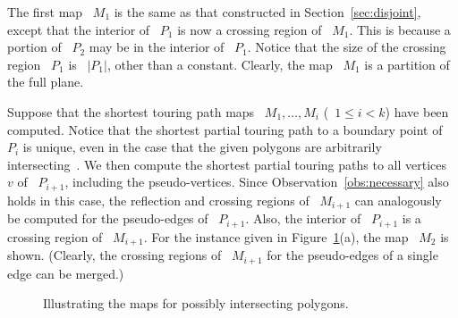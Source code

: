 \documentclass[11pt]{article}
\begin{document}
The first map ~\(M_1\) is the same as that constructed in Section~\ref{sec:disjoint}, except that the interior of ~\(P_1\) is now a crossing region of ~\(M_1\).
This is because a portion of ~\(P_2\) may be in the interior of ~\(P_1\).
Notice that the size of the crossing region ~\(P_1\) is ~\(|P_1|\), other than a constant.
Clearly, the map ~\(M_1\) is a partition of the full plane.

Suppose that the shortest touring path maps ~\(M_1, \ldots, M_i\) (~\(1 \le i < k\)) have been computed.
Notice that the shortest partial touring path to a boundary point of ~\(P_i\) is unique, even in the case that the given polygons are arbitrarily intersecting~\cite{ref6}.
We then compute the shortest partial touring paths to all vertices ~\(v\) of ~\(P_{i+1}\), including the pseudo-vertices.
Since Observation~\ref{obs:necessary} also holds in this case, the reflection and crossing regions of ~\(M_{i+1}\) can analogously be computed for the pseudo-edges of ~\(P_{i+1}\).
Also, the interior of ~\(P_{i+1}\) is a crossing region of ~\(M_{i+1}\).
For the instance given in Figure~\ref{fig:intersectingmaps}(a), the map ~\(M_2\) is shown.
(Clearly, the crossing regions of ~\(M_{i+1}\) for the pseudo-edges of a single edge can be merged.)

\begin{figure}[H]
	\centering
	\caption{Illustrating the maps for possibly intersecting polygons.}
	\label{fig:intersectingmaps}
\end{figure}
\end{document}
